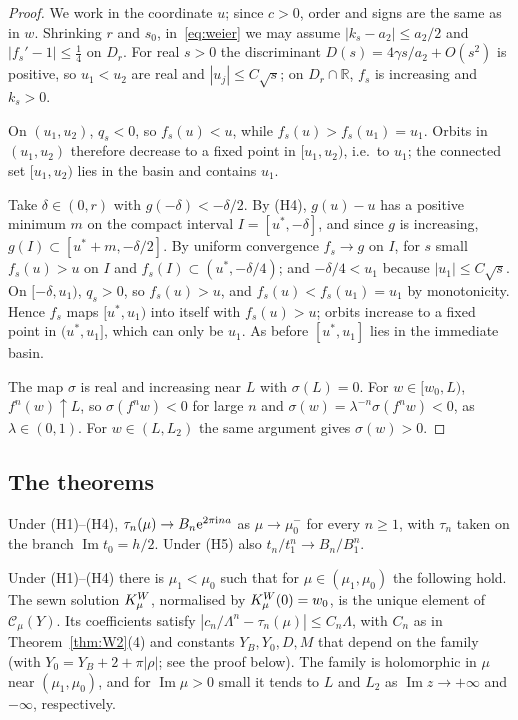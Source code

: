 \begin{proof}
We work in the coordinate $u$; since $c>0$, order and signs are the same as in
$w$.  Shrinking $r$ and $s_0$, in~\eqref{eq:weier} we may assume
$|k_s-a_2|\le a_2/2$ and $|f_s'-1|\le\tfrac14$ on $D_r$.  For real $s>0$ the
discriminant $D(s)=4\gamma s/a_2+O(s^2)$ is positive, so $u_1<u_2$ are real and
$|u_j|\le C\sqrt s$; on $D_r\cap\mathbb R$, $f_s$ is increasing and $k_s>0$.

On $(u_1,u_2)$, $q_s<0$, so $f_s(u)<u$, while $f_s(u)>f_s(u_1)=u_1$.  Orbits in
$(u_1,u_2)$ therefore decrease to a fixed point in $[u_1,u_2)$, i.e.\ to $u_1$;
the connected set $[u_1,u_2)$ lies in the basin and contains $u_1$.

Take $\delta\in(0,r)$ with $g(-\delta)<-\delta/2$.  By \textup{(H4)}, $g(u)-u$ has a
positive minimum $m$ on the compact interval $I=[u^*,-\delta]$, and since $g$ is
increasing, $g(I)\subset[u^*+m,-\delta/2]$.  By uniform convergence $f_s\to g$
on $I$, for $s$ small $f_s(u)>u$ on $I$ and $f_s(I)\subset(u^*,-\delta/4)$; and
$-\delta/4<u_1$ because $|u_1|\le C\sqrt s$.  On $[-\delta,u_1)$, $q_s>0$, so
$f_s(u)>u$, and $f_s(u)<f_s(u_1)=u_1$ by monotonicity.  Hence $f_s$ maps
$[u^*,u_1)$ into itself with $f_s(u)>u$; orbits increase to a fixed point in
$(u^*,u_1]$, which can only be $u_1$.  As before $[u^*,u_1]$ lies in the
immediate basin.

The map $\sigma$ is real and increasing near $L$ with $\sigma(L)=0$.  For
$w\in[w_0,L)$, $f^n(w)\uparrow L$, so $\sigma(f^nw)<0$ for large $n$ and
$\sigma(w)=\lambda^{-n}\sigma(f^nw)<0$, as $\lambda\in(0,1)$.  For $w\in(L,L_2)$ the
same argument gives $\sigma(w)>0$.
\end{proof}

\subsection{The theorems}

\begin{theorem}\label{thm:gen-A}
Under \textup{(H1)--(H4)}, $\tau_n(\mu)\to B_n\mathrm{e}^{2\pi\mathrm{i} na}$ as $\mu\to\mu_0^-$ for every
$n\ge1$, with $\tau_n$ taken on the branch $\operatorname{Im}t_0=h/2$.  Under
\textup{(H5)} also $t_n/t_1^n\to B_n/B_1^n$.
\end{theorem}

\begin{theorem}\label{thm:gen-B}
Under \textup{(H1)--(H4)} there is $\mu_1<\mu_0$ such that for
$\mu\in(\mu_1,\mu_0)$ the following hold.  The sewn solution $K^W_\mu$,
normalised by $K^W_\mu(0)=w_0$, is the unique element of $\mathcal C_\mu(Y)$.  Its
coefficients satisfy $|c_n/\Lambda^n-\tau_n(\mu)|\le C_n\Lambda$, with $C_n$ as in
Theorem~\ref{thm:W2}(4) and constants $Y_B,Y_0,D,M$ that depend on the family
\textup{(}with $Y_0=Y_B+2+\pi|\rho|$; see the proof below\textup{)}.
The family is holomorphic in $\mu$ near $(\mu_1,\mu_0)$, and for $\operatorname{Im}\mu>0$
small it tends to $L$ and $L_2$ as $\operatorname{Im}z\to+\infty$ and $-\infty$,
respectively.
\end{theorem}

